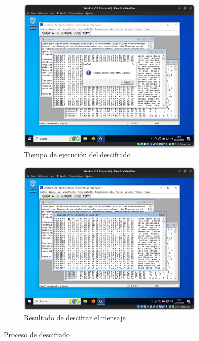 \begin{figure}[H]
    \centering
    \begin{subfigure}{.5\textwidth}
        \centering
        \includegraphics[width=\textwidth]{DesencriptadoRSA-1}
        \caption{Tiempo de ejecución del descifrado}
        \label{fig:RSA-deciph-time}
    \end{subfigure}%
    \begin{subfigure}{.5\textwidth}
        \centering
        \includegraphics[width=\textwidth]{DesencriptadoRSA-2}
        \caption{Resultado de descifrar el mensaje}
    \end{subfigure}
    \caption{Proceso de descifrado}
    \label{fig:RSA-deciph}
\end{figure}

